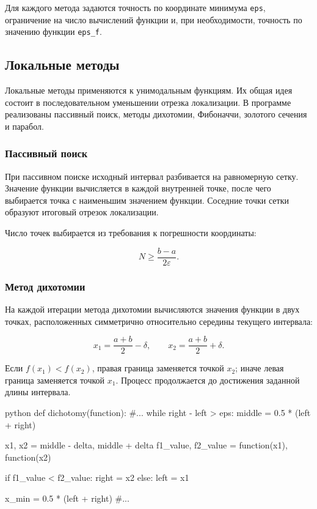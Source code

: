 Для каждого метода задаются точность по координате минимума
\texttt{eps}, ограничение на число вычислений функции и, при необходимости,
точность по значению функции \texttt{eps\_f}.

\subsection{Локальные методы}

Локальные методы применяются к унимодальным функциям. Их общая идея состоит
в последовательном уменьшении отрезка локализации. В программе реализованы
пассивный поиск, методы дихотомии, Фибоначчи, золотого сечения
и парабол.

\subsubsection{Пассивный поиск}

При пассивном поиске исходный интервал разбивается на равномерную сетку.
Значение функции вычисляется в каждой внутренней точке, после чего выбирается
точка с наименьшим значением функции. Соседние точки сетки образуют итоговый
отрезок локализации.

Число точек выбирается из требования к погрешности координаты:

\begin{equation}
N \geq \frac{b-a}{2\varepsilon}.
\end{equation}

\subsubsection{Метод дихотомии}

На каждой итерации метода дихотомии вычисляются значения функции в двух точках,
расположенных симметрично относительно середины текущего интервала:

\begin{equation}
x_1 = \frac{a+b}{2} - \delta, \qquad
x_2 = \frac{a+b}{2} + \delta.
\end{equation}

Если $f(x_1) < f(x_2)$, правая граница заменяется точкой $x_2$; иначе левая
граница заменяется точкой $x_1$. Процесс продолжается до достижения заданной
длины интервала.

\begin{mintedbox}{python}
    def dichotomy(function):
        #...
        while right - left > eps:
            middle = 0.5 * (left + right)

            x1, x2 = middle - delta, middle + delta
            f1_value, f2_value = function(x1), function(x2)

            if f1_value < f2_value:
                right = x2
            else:
                left = x1
        
        x_min = 0.5 * (left + right)
        #...
\end{mintedbox}

